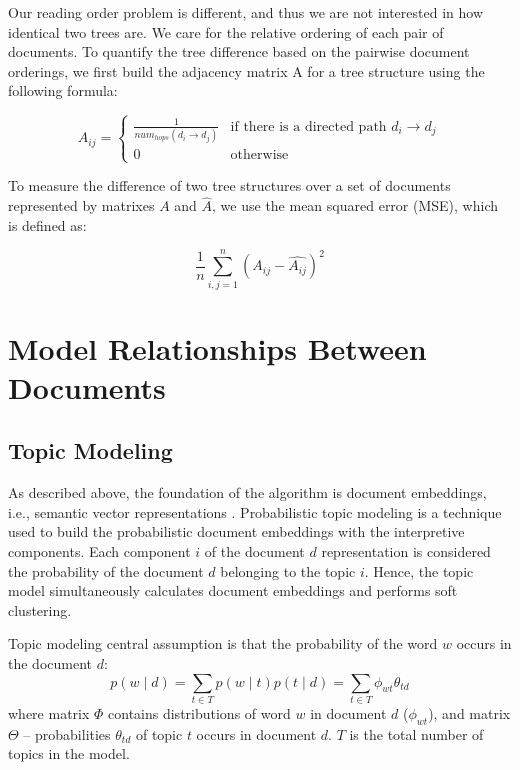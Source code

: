 \documentclass[12pt,twoside]{article}
\begin{document}
	Our reading order problem is different, and thus we are not interested in how identical two trees are. We care for the relative ordering of each pair of documents. To quantify the tree difference based on the pairwise document orderings, we first build the adjacency matrix A for a tree structure using the following formula:
	
	\begin{equation}
    A_{ij} = 
    \begin{cases}
    \frac{1}{num_{hops}(d_i \rightarrow d_j)} &\text{if there is a directed path $d_i \rightarrow d_j$}\\
    0 &\text{otherwise}
    \end{cases}
    \end{equation}
    
    To measure the difference of two tree structures over a set of documents represented by matrixes $A$ and $\hat{A}$, we use the mean squared error (MSE), which is defined as:
    
    \begin{equation}
	\frac{1}{n} \sum\limits_{i,j = 1}^n(A_{ij}-\hat{A_{ij}})^2
	\end{equation}
	
	\section{Model Relationships Between Documents}
	
	\subsection{Topic Modeling}
	    As described above, the foundation of the algorithm is document embeddings, i.e., semantic vector representations \cite{meysam17word}. Probabilistic topic modeling \cite{hofmann1999probabilistic} is a technique used to build the probabilistic document embeddings with the interpretive components. Each component $i$ of the document $d$ representation is considered the probability of the document $d$ belonging to the topic $i$. Hence, the topic model simultaneously calculates document embeddings and performs soft clustering. 

        Topic modeling central assumption is that the probability of the word $w$ occurs in the document $d$: 
        \begin{equation}
            p(w \mid d) = \sum\limits_{t \in T} p(w \mid t)p(t \mid d) = \sum\limits_{t \in T} \phi_{wt}\theta_{td}
        \end{equation}
        where matrix $\Phi$ contains distributions of word $w$ in document $d$ ($\phi_{wt}$), and matrix $\Theta$ -- probabilities $\theta_{td}$ of topic $t$ occurs in document $d$. $T$ is the total number of topics in the model. \\ 
        
\end{document}
